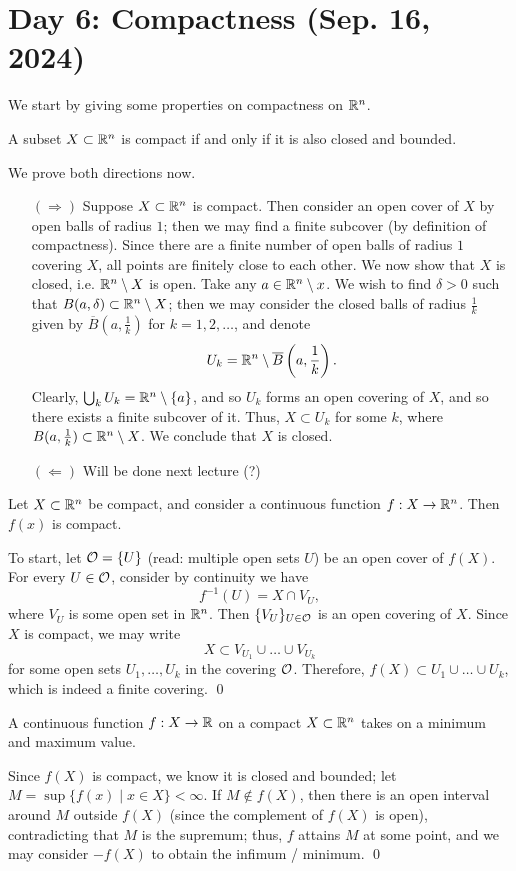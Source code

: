 \section{Day 6: Compactness (Sep. 16, 2024)}
We start by giving some properties on compactness on $\mathbb R^n$.
\begin{simplethm}
    A subset $X \subset \mathbb R^n$ is compact if and only if it is also closed and bounded.
\end{simplethm}
\noindent We prove both directions now.
\begin{itemize}
    \item[$(\Rightarrow)$] Suppose $X \subset \mathbb R^n$ is compact. Then consider an open cover of $X$ by open balls of radius $1$; then we may find a finite subcover (by definition of compactness). Since there are a finite number of open balls of radius $1$ covering $X$, all points are finitely close to each other.
    \medskip\newline
    \noindent We now show that $X$ is closed, i.e. $\mathbb R^n \setminus X$ is open. Take any $a \in \mathbb R^n \setminus x$. We wish to find $\delta > 0$ such that $B(a, \delta) \subset \mathbb R^n \setminus X$; then we may consider the closed balls of radius $\frac{1}{k}$ given by $\overline{B}(a, \frac{1}{k})$ for $k = 1, 2, \dots$, and denote
    \[ U_k = \mathbb R^n \setminus \overline{B}\left(a, \frac{1}{k}\right). \]
    Clearly, $\bigcup_k U_k = \mathbb R^n \setminus \{a\}$, and so $U_k$ forms an open covering of $X$, and so there exists a finite subcover of it. Thus, $X \subset U_k$ for some $k$, where $B(a, \frac{1}{k}) \subset \mathbb R^n \setminus X$. We conclude that $X$ is closed.
    \item[$(\Leftarrow)$] Will be done next lecture (?)
\end{itemize}
\begin{simplethm}
    Let $X \subset \mathbb R^n$ be compact, and consider a continuous function $f : X \to \mathbb R^n$. Then $f(x)$ is compact.
\end{simplethm}
\noindent To start, let $\mathcal O = \{U\}$ (read: multiple open sets $U$) be an open cover of $f(X)$. For every $U \in \mathcal O$, consider by continuity we have
\[ f^{-1}(U) = X \cap V_U, \]
where $V_U$ is some open set in $\mathbb R^n$. Then $\{V_U\}_{U \in \mathcal O}$ is an open covering of $X$. Since $X$ is compact, we may write
\[ X \subset V_{U_1} \cup \dots \cup V_{U_k} \]
for some open sets $U_1, \dots, U_k$ in the covering $\mathcal O$. Therefore, $f(X) \subset U_1 \cup \dots \cup U_k$, which is indeed a finite covering. \qed
\begin{simplethm}
    A continuous function $f : X \to \mathbb R$ on a compact $X \subset \mathbb R^n$ takes on a minimum and maximum value.
\end{simplethm}
\noindent Since $f(X)$ is compact, we know it is closed and bounded; let $M = \sup\{f(x) \mid x \in X\} < \infty$. If $M \not\in f(X)$, then there is an open interval around $M$ outside $f(X)$ (since the complement of $f(X)$ is open), contradicting that $M$ is the supremum; thus, $f$ attains $M$ at some point, and we may consider $-f(X)$ to obtain the infimum / minimum. \qed

